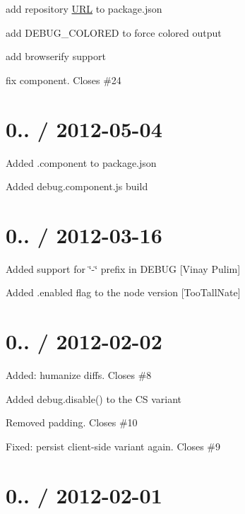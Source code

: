 \begin{DoxyItemize}
\item add repository \hyperlink{struct_u_r_l}{U\+R\+L} to package.\+json
\item add D\+E\+B\+U\+G\+\_\+\+C\+O\+L\+O\+R\+E\+D to force colored output
\item add browserify support
\item fix component. Closes \#24
\end{DoxyItemize}

\section*{0.. / 2012-\/05-\/04 }


\begin{DoxyItemize}
\item Added .component to package.\+json
\item Added debug.\+component.\+js build
\end{DoxyItemize}

\section*{0.. / 2012-\/03-\/16 }


\begin{DoxyItemize}
\item Added support for \char`\"{}-\/\char`\"{} prefix in D\+E\+B\+U\+G \mbox{[}Vinay Pulim\mbox{]}
\item Added {\ttfamily .enabled} flag to the node version \mbox{[}Too\+Tall\+Nate\mbox{]}
\end{DoxyItemize}

\section*{0.. / 2012-\/02-\/02 }


\begin{DoxyItemize}
\item Added\+: humanize diffs. Closes \#8
\item Added {\ttfamily debug.\+disable()} to the C\+S variant
\item Removed padding. Closes \#10
\item Fixed\+: persist client-\/side variant again. Closes \#9
\end{DoxyItemize}

\section*{0.. / 2012-\/02-\/01 }


